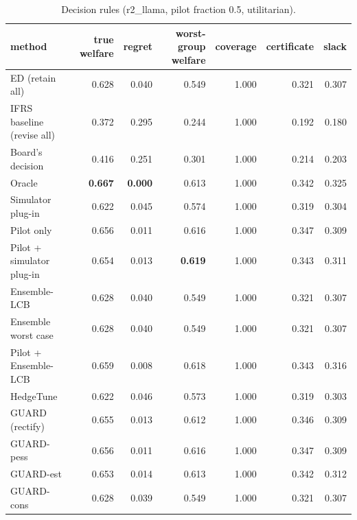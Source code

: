 \begin{table}[t]
\centering
\small
\begin{tabular}{lrrrrrr}
\toprule
method & true welfare & regret & worst-group welfare & coverage & certificate & slack \\
\midrule
ED (retain all) & 0.628 & 0.040 & 0.549 & 1.000 & 0.321 & 0.307 \\
IFRS baseline (revise all) & 0.372 & 0.295 & 0.244 & 1.000 & 0.192 & 0.180 \\
Board's decision & 0.416 & 0.251 & 0.301 & 1.000 & 0.214 & 0.203 \\
Oracle & \textbf{0.667} & \textbf{0.000} & 0.613 & 1.000 & 0.342 & 0.325 \\
Simulator plug-in & 0.622 & 0.045 & 0.574 & 1.000 & 0.319 & 0.304 \\
Pilot only & 0.656 & 0.011 & 0.616 & 1.000 & 0.347 & 0.309 \\
Pilot + simulator plug-in & 0.654 & 0.013 & \textbf{0.619} & 1.000 & 0.343 & 0.311 \\
Ensemble-LCB & 0.628 & 0.040 & 0.549 & 1.000 & 0.321 & 0.307 \\
Ensemble worst case & 0.628 & 0.040 & 0.549 & 1.000 & 0.321 & 0.307 \\
Pilot + Ensemble-LCB & 0.659 & 0.008 & 0.618 & 1.000 & 0.343 & 0.316 \\
HedgeTune & 0.622 & 0.046 & 0.573 & 1.000 & 0.319 & 0.303 \\
GUARD (rectify) & 0.655 & 0.013 & 0.612 & 1.000 & 0.346 & 0.309 \\
GUARD-pess & 0.656 & 0.011 & 0.616 & 1.000 & 0.347 & 0.309 \\
GUARD-est & 0.653 & 0.014 & 0.613 & 1.000 & 0.342 & 0.312 \\
GUARD-cons & 0.628 & 0.039 & 0.549 & 1.000 & 0.321 & 0.307 \\
\bottomrule
\end{tabular}
\caption{Decision rules (r2\_llama, pilot fraction 0.5, utilitarian).}
\label{tab:methods-utilitarian}
\end{table}
